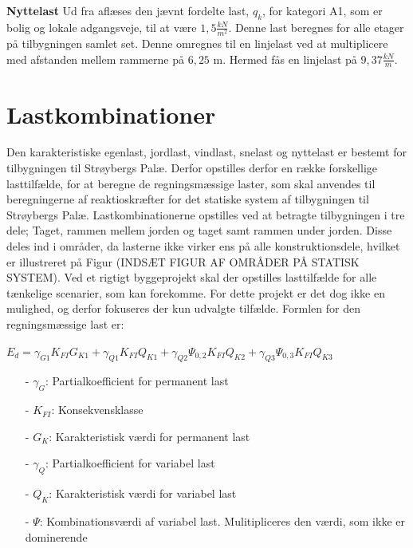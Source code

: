 \textbf{Nyttelast}
Ud fra \citep[ tabel 6.2 kapitel 6.3.1.2]{EU91} aflæses den jævnt fordelte last, $q_k$, for kategori A1, som er bolig og lokale adgangsveje, til at være $1,\!5 \frac{kN}{m^2}$. Denne last beregnes for alle etager på tilbygningen samlet set. Denne omregnes til en linjelast ved at multiplicere med afstanden mellem rammerne på $6,\!25$ m. Hermed fås en linjelast på $9,\!37 \frac{kN}{m}$. 

\section{Lastkombinationer}
Den karakteristiske egenlast, jordlast, vindlast, snelast og nyttelast er bestemt for tilbygningen til Strøybergs Palæ. Derfor opstilles derfor en række forskellige lasttilfælde, for at beregne de regningsmæssige laster, som skal anvendes til beregningerne af reaktioskræfter for det statiske system af tilbygningen til Strøybergs Palæ.
\newline \indent{     }  Lastkombinationerne opstilles ved at betragte tilbygningen i tre dele; Taget, rammen mellem jorden og taget samt rammen under jorden. Disse deles ind i områder, da lasterne ikke virker ens på alle konstruktionsdele, hvilket er illustreret på Figur (INDSÆT FIGUR AF OMRÅDER PÅ STATISK SYSTEM).
\newline
\newline
Ved et rigtigt byggeprojekt skal der opstilles lasttilfælde for alle tænkelige scenarier, som kan forekomme. For dette projekt er det dog ikke en mulighed, og derfor fokuseres der kun udvalgte tilfælde.
\newline
\newline
Formlen for den regningsmæssige last er:
\begin{center}
	$E_d = \gamma_{G1} K_{FI} G_{K1} + \gamma_{Q1} K_{FI} Q_{K1} + \gamma_{Q2} \Psi_{0,2} K_{FI} Q_{K2} + \gamma_{Q3} \Psi_{0,3} K_{FI} Q_{K3}$ 
\end{center}

\begin{itemize}
	\item[-] $\gamma_G$: Partialkoefficient for permanent last
	\item[-] $K_{FI}$: Konsekvensklasse
	\item[-] $G_K$: Karakteristisk værdi for permanent last
	\item[-] $\gamma_Q$: Partialkoefficient for variabel last
	\item[-] $Q_K$: Karakteristisk værdi for variabel last
	\item[-] $\Psi$: Kombinationsværdi af variabel last. Mulitipliceres den værdi, som ikke er dominerende 
\end{itemize}

